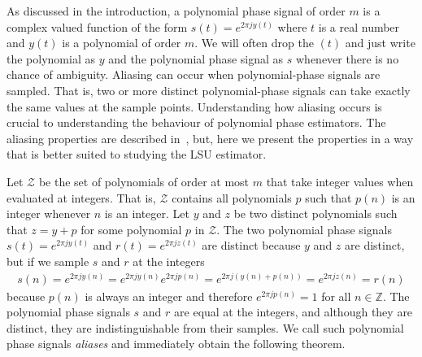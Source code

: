 \documentclass[aap]{imsart}
\newcommand{\ints}{{\mathbb Z}}
\newcommand{\term}{\emph}
\begin{document}
As discussed in the introduction, a polynomial phase signal of order $m$ is a complex valued function of the form $s(t) = e^{2\pi j y(t)}$ where $t$ is a real number and $y(t)$ is a polynomial of order $m$. We will often drop the $(t)$ and just write the polynomial as $y$ and the polynomial phase signal as $s$ whenever there is no chance of ambiguity. %
Aliasing can occur when polynomial-phase signals are sampled.  That is, two or more distinct polynomial-phase signals can take exactly the same values at the sample points.  Understanding how aliasing occurs is crucial to understanding the behaviour of polynomial phase estimators.  The aliasing properties are described in~\cite{McKilliam2009IndentifiabliltyAliasingPolyphase}, but, here we present the properties in a way that is better suited to studying the LSU estimator.  %

Let $\mathcal{Z}$ be the set of polynomials of order at most $m$ that take integer values when evaluated at integers. That is, $\mathcal{Z}$ contains all polynomials $p$ such that $p(n)$ is an integer whenever $n$ is an integer.
Let $y$ and $z$ be two distinct polynomials such that $z = y + p$ for some polynomial $p$ in $\mathcal{Z}$. The two polynomial phase signals $s(t) = e^{2\pi j y(t)}$ and $r(t) = e^{2\pi j z(t)}$ are distinct because $y$ and $z$ are distinct, but if we sample $s$ and $r$ at the integers  
\begin{align*}
s(n) = e^{2\pi j y(n)} =  e^{2\pi j y(n)} e^{2\pi j p(n)} = e^{2\pi j (y(n) + p(n))} = e^{2\pi j z(n)} = r(n)
\end{align*}
because $p(n)$ is always an integer and therefore $e^{2\pi j p(n)} = 1$ for all $n \in \ints$. The polynomial phase signals $s$ and $r$ are equal at the integers, and although they are distinct, they are indistinguishable from their samples. We call such polynomial phase signals \term{aliases} and immediately obtain the following theorem.
\end{document}
